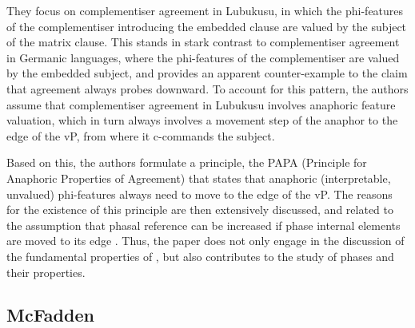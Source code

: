\documentclass[output=paper
,modfonts
,nonflat]{langsci/langscibook}
\begin{document}
They focus on complementiser agreement in Lubukusu, in which the phi-fea\-tures of the complementiser introducing the embedded clause are valued by the subject of the matrix clause. This stands in stark contrast to complementiser agreement in Germanic languages, where the  phi-features of the complementiser are valued by the embedded subject, and provides an apparent counter-example to the claim that agreement always probes downward. To account for this pattern, the authors assume that complementiser agreement in Lubukusu involves anaphoric feature valuation, which in turn always involves a movement step of the anaphor to the edge of the vP, from where it c-commands the subject.

Based on this, the authors formulate a principle, the PAPA (Principle for Anaphoric Properties of Agreement) that states that anaphoric (interpretable, unvalued) phi-features always need to move to the edge of the vP. The reasons for the existence of this principle are then extensively discussed, and related to the assumption that phasal reference can be increased if phase internal elements are moved to its edge \citep{HinzenSheehan2013}. Thus, the paper does not only engage in the discussion of the fundamental properties of \agr{}, but also contributes to the study of phases and their properties.


\subsection{McFadden}
\label{sec:mcfadden}
\end{document}
